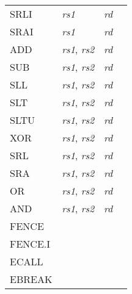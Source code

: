 \begin{tabular}{p{25mm}|p{3cm}|p{6cm}|p{4cm}}
   \cline{2-3}
   SRLI & {\em rs1} & {\em rd} &  \\
   \cline{2-3}
   SRAI & {\em rs1} & {\em rd} &  \\
   \cline{2-3}
   ADD & {\em rs1}, {\em rs2} & {\em rd} &  \\
   \cline{2-3}
   SUB & {\em rs1}, {\em rs2} & {\em rd} &  \\
   \cline{2-3}
   SLL & {\em rs1}, {\em rs2} & {\em rd} &  \\
   \cline{2-3}
   SLT & {\em rs1}, {\em rs2} & {\em rd} &  \\
   \cline{2-3}
   SLTU & {\em rs1}, {\em rs2} & {\em rd} &  \\
   \cline{2-3}
   XOR & {\em rs1}, {\em rs2} & {\em rd} &  \\
   \cline{2-3}
   SRL & {\em rs1}, {\em rs2} & {\em rd} &  \\
   \cline{2-3}
   SRA & {\em rs1}, {\em rs2} & {\em rd} &  \\
   \cline{2-3}
   OR & {\em rs1}, {\em rs2} & {\em rd} &  \\
   \cline{2-3}
   AND & {\em rs1}, {\em rs2} & {\em rd} &  \\
   \cline{2-3}
   FENCE &  &  &  \\
   \cline{2-3}
   FENCE.I &  &  &  \\
   \cline{2-3}
   ECALL &  &  &  \\
   \cline{2-3}
   EBREAK &  &  &  \\
   \cline{2-3}
\end{tabular}


